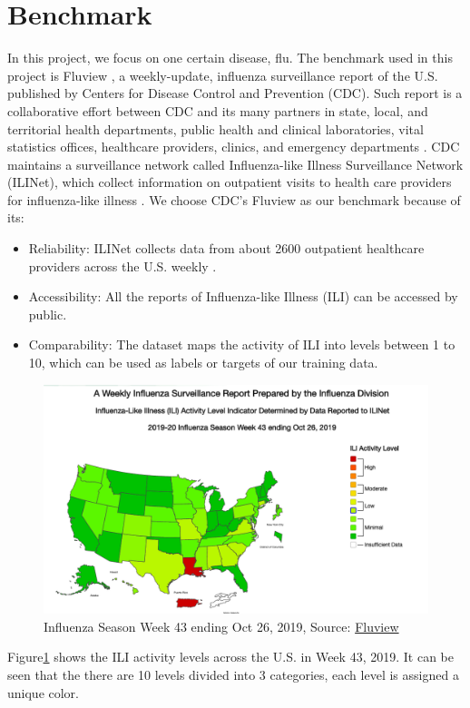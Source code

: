 \section{Benchmark}
In this project, we focus on one certain disease, flu. The benchmark used in this project is Fluview \cite{cdc:fluView}, a weekly-update, influenza surveillance report of the U.S. published by Centers for Disease Control and Prevention (CDC)\cite{cdc.gov}. Such report is a collaborative effort between CDC and its many partners in state, local, and territorial health departments, public health and clinical laboratories, vital statistics offices, healthcare providers, clinics, and emergency departments \cite{cdc.gov}. CDC maintains a surveillance network called Influenza-like Illness Surveillance Network (ILINet), which collect information on outpatient visits to health care providers for influenza-like illness \cite{cdc.gov}. We choose CDC's Fluview as our benchmark because of its:
\begin{itemize}
    \item Reliability: ILINet collects data from about 2600 outpatient healthcare providers across the U.S. weekly \cite{cdc.gov}.
    \item Accessibility: All the reports of Influenza-like Illness (ILI) can be accessed by public.
    \item Comparability: The dataset maps the activity of ILI into levels between 1 to 10, which can be used as labels or targets of our training data.
\end{itemize}
\begin{figure}[!htbp]
   \center
   \includegraphics[width=6in]{images/week43.png}
   \caption{Influenza Season Week 43 ending Oct 26, 2019, Source: \href{https://www.cdc.gov/flu/weekly/index.htm\#ILIActivityMap}{Fluview}}
   \label{fig:fluView}
\end{figure}
Figure\ref{fig:fluView} shows the ILI activity levels across the U.S. in Week 43, 2019. It can be seen that the there are 10 levels divided into 3 categories, each level is assigned a unique color.
